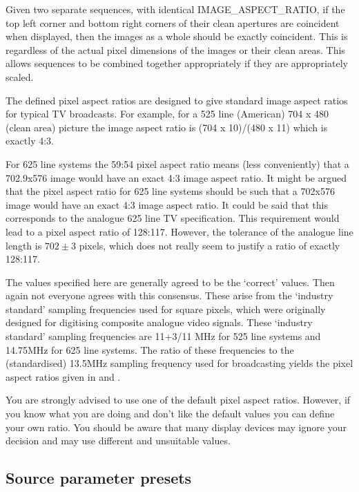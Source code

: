 \begin{informative*}
Given two separate sequences, with identical IMAGE\_ASPECT\_RATIO, if the
top left corner and bottom right corners of their clean apertures are
coincident when displayed, then the images as a whole should be exactly
coincident. This is regardless of the actual pixel dimensions of the
images or their clean areas. This allows sequences to be combined
together appropriately if they are appropriately scaled.


The defined pixel aspect ratios are designed to give standard image
aspect ratios for typical TV broadcasts. For example, for a 525 line
(American) 704 x 480 (clean area)  picture the image aspect ratio is
(704 x 10)/(480 x 11) which is exactly 4:3.


For 625 line systems the 59:54 pixel aspect ratio means (less
conveniently) that a 702.9x576 image would have an exact 4:3 image
aspect ratio. It might be argued that the pixel aspect ratio for 625
line systems should be such that a 702x576 image would have an exact 4:3
image aspect ratio. It could be said that this corresponds to the
analogue 625 line TV specification. This requirement would lead to a
pixel aspect ratio of 128:117. However, the tolerance of the analogue
line length is $702\pm 3$ pixels, which does not really seem to justify a
ratio of exactly 128:117.

The values specified here are generally agreed to be the
`correct' values. Then again not everyone agrees with this
consensus. These arise from the `industry standard' sampling
frequencies used for square pixels, which were originally designed for
digitising composite analogue video signals. These `industry
standard' sampling frequencies are 11+3/11 MHz for 525 line systems
and 14.75MHz for 625 line systems. The ratio of these frequencies to the
(standardised) 13.5MHz sampling frequency used for broadcasting yields
the pixel aspect ratios given in  and .

You are strongly advised to use one of the default pixel aspect ratios.
However, if you know what you are doing and don't like the default
values you can define your own ratio. You should be aware that many
display devices may ignore your decision and may use different and
unsuitable values. 


\end{informative*}
\subsection{Source parameter presets}


